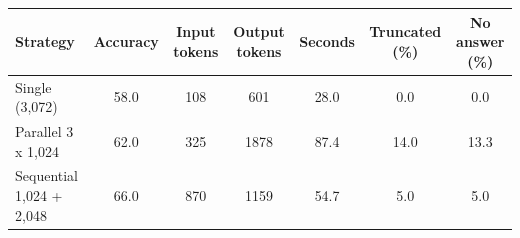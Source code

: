 \begin{tabular}{lcccccc}\toprule Strategy & Accuracy & Input tokens & Output tokens & Seconds & Truncated (\%) & No answer (\%) \\ \midrule
Single (3,072) & 58.0 & 108 & 601 & 28.0 & 0.0 & 0.0 \\
Parallel 3 x 1,024 & 62.0 & 325 & 1878 & 87.4 & 14.0 & 13.3 \\
Sequential 1,024 + 2,048 & 66.0 & 870 & 1159 & 54.7 & 5.0 & 5.0 \\
\bottomrule\end{tabular}
